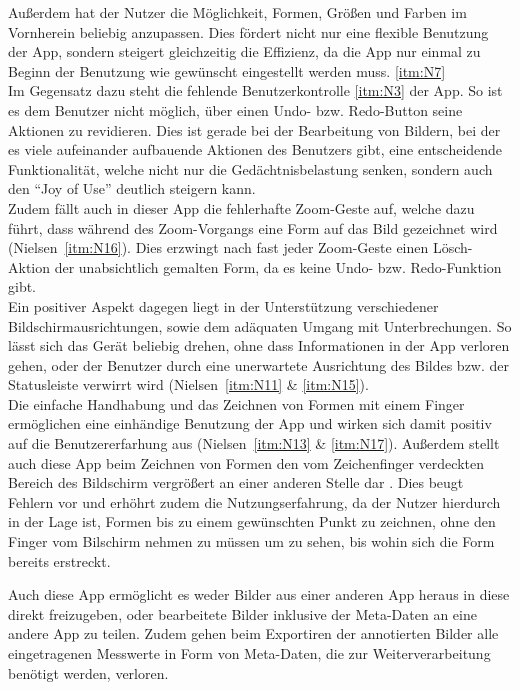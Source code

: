 Außerdem hat der Nutzer die Möglichkeit, Formen, Größen und Farben im Vornherein beliebig anzupassen.
Dies fördert nicht nur eine flexible Benutzung der App, sondern steigert gleichzeitig die Effizienz, da die App nur einmal zu Beginn der Benutzung wie gewünscht eingestellt werden muss. \autoref{itm:N7} \\

Im Gegensatz dazu steht die fehlende Benutzerkontrolle \autoref{itm:N3} der App.
So ist es dem Benutzer nicht möglich, über einen Undo- bzw. Redo-Button seine Aktionen zu revidieren.
Dies ist gerade bei der Bearbeitung von Bildern, bei der es viele aufeinander aufbauende Aktionen des Benutzers gibt, eine entscheidende Funktionalität, welche nicht nur die Gedächtnisbelastung senken, sondern auch den ``Joy of Use'' deutlich steigern kann. \\

Zudem fällt auch in dieser App die fehlerhafte Zoom-Geste auf, welche dazu führt, dass während des Zoom-Vorgangs eine Form auf das Bild gezeichnet wird (Nielsen~\autoref{itm:N16}).
Dies erzwingt nach fast jeder Zoom-Geste einen Lösch-Aktion der unabsichtlich gemalten Form, da es keine Undo- bzw. Redo-Funktion gibt. \\

Ein positiver Aspekt dagegen liegt in der Unterstützung verschiedener Bildschirmausrichtungen, sowie dem adäquaten Umgang mit Unterbrechungen.
So lässt sich das Gerät beliebig drehen, ohne dass Informationen in der App verloren gehen, oder der Benutzer durch eine unerwartete Ausrichtung des Bildes bzw. der Statusleiste verwirrt wird (Nielsen~\autoref{itm:N11} \& \autoref{itm:N15}). \\

Die einfache Handhabung und das Zeichnen von Formen mit einem Finger ermöglichen eine einhändige Benutzung der App und wirken sich damit positiv auf die Benutzererfarhung aus (Nielsen~\autoref{itm:N13} \& \autoref{itm:N17}).
Außerdem stellt auch diese App beim Zeichnen von Formen den vom Zeichenfinger verdeckten Bereich des Bildschirm vergrößert an einer anderen Stelle dar .
Dies beugt Fehlern vor und erhöhrt zudem die Nutzungserfahrung, da der Nutzer hierdurch in der Lage ist, Formen bis zu einem gewünschten Punkt zu zeichnen, ohne den Finger vom Bilschirm nehmen zu müssen um zu sehen, bis wohin sich die Form bereits erstreckt.

Auch diese App ermöglicht es weder Bilder aus einer anderen App heraus in diese direkt freizugeben, oder bearbeitete Bilder inklusive der Meta-Daten an eine andere App zu teilen.
Zudem gehen beim Exportiren der annotierten Bilder alle eingetragenen Messwerte in Form von Meta-Daten, die zur Weiterverarbeitung benötigt werden, verloren.


